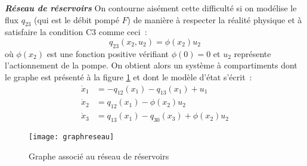 \begin{exemple}{\bf \em Réseau de réservoirs}
On contourne aisément cette difficulté si on modélise le flux $q_{23}$ (qui est le
débit pompé $F$) de manière à respecter la réalité physique et à satisfaire la
condition C3 comme ceci~:
$$
q_{23}(x_2,u_2) = \phi(x_2)u_2
$$
où $\phi(x_2)$ est une fonction positive vérifiant $\phi(0) = 0$ et
$u_2$ représente l'actionnement de la pompe. On obtient alors un système à
compartiments dont le graphe est présenté à la figure \ref{Fig:graphreseau} et
dont le modèle d'état s'écrit~:
\begin{equation*} \begin{split}
\dot x_1 &= - q_{12}(x_1) - q_{13}(x_1) + u_1 \\
\dot x_2 &=  q_{12}(x_1) - \phi(x_2)u_2 \\
\dot x_3 &= q_{13}(x_1) - q_{30}(x_3) + \phi(x_{2})u_2 
\end{split} \end{equation*}
\begin{figure}[h] 
\begin{center}
\texttt{[image: graphreseau]}
\caption{Graphe associé au réseau de réservoirs}
\label{Fig:graphreseau}
\end{center} 
\end{figure}
\cqfd
\end{exemple}

